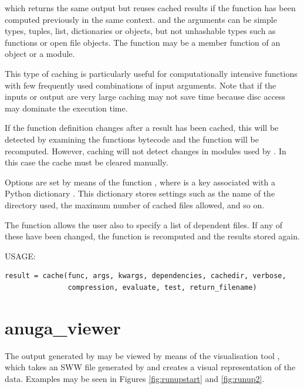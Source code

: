 \documentclass{manual}
\begin{document}
which returns the same output but reuses cached
results if the function has been computed previously in the same context.
 and the arguments can be simple types, tuples, list, dictionaries or
objects, but not unhashable types such as functions or open file objects.
The function  may be a member function of an object or a module.

This type of caching is particularly useful for computationally intensive
functions with few frequently used combinations of input arguments. Note that
if the inputs or output are very large caching may not save time because
disc access may dominate the execution time.

If the function definition changes after a result has been cached, this will be
detected by examining the functions bytecode and the function will be recomputed.
However, caching will not detect changes in modules used by .
In this case the cache must be cleared manually.

Options are set by means of the function ,
where  is a key associated with a
Python dictionary . This dictionary stores settings such as the name of
the directory used, the maximum number of cached files allowed, and so on.

The  function allows the user also to specify a list of dependent files. If any of these
have been changed, the function is recomputed and the results stored again.


USAGE: \nopagebreak

\begin{verbatim}
result = cache(func, args, kwargs, dependencies, cachedir, verbose,
               compression, evaluate, test, return_filename)
\end{verbatim}



\pagebreak
\section{anuga\_viewer}
\label{sec:anuga_viewer}

The output generated by \anuga may be viewed by
means of the visualisation tool , which takes an
SWW file generated by \anuga and creates a visual representation
of the data. Examples may be seen in Figures \ref{fig:runupstart}
and \ref{fig:runup2}. 
\end{document}
